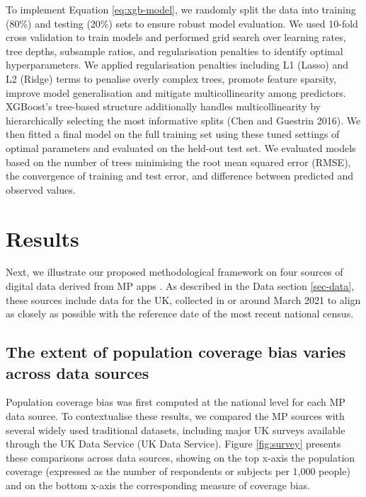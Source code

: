 \documentclass{article}
\begin{document}
To implement Equation \ref{eq:xgb-model}, we randomly split the data
into training (80\%) and testing (20\%) sets to ensure robust model
evaluation. We used 10-fold cross validation to train models and
performed grid search over learning rates, tree depths, subsample
ratios, and regularisation penalties to identify optimal
hyperparameters. We applied regularisation penalties including L1
(Lasso) and L2 (Ridge) terms to penalise overly complex trees, promote
feature sparsity, improve model generalisation and mitigate
multicollinearity among predictors. XGBoost's tree-based structure
additionally handles multicollinearity by hierarchically selecting the
most informative splits (Chen and Guestrin 2016). We then fitted a final model on the
full training set using these tuned settings of optimal parameters and
evaluated on the held-out test set. We evaluated models based on the
number of trees minimising the root mean squared error (RMSE), the
convergence of training and test error, and difference between predicted
and observed values.

\section{Results}\label{results}

Next, we illustrate our proposed methodological framework on four
sources of digital data derived from MP apps . As
described in the Data section \ref{sec-data}, these sources include
data for the UK, collected in or around March 2021 to align as closely
as possible with the reference date of the most recent national census.

\subsection{The extent of population coverage bias varies across data sources}\label{the-extent-of-population-coverage-bias-varies-across-data-sources}

Population coverage bias was first computed at the national level for
each MP data source. To contextualise these results, we compared the MP
sources with several widely used traditional datasets, including major
UK surveys available through the UK Data Service
(UK Data Service). Figure \ref{fig:survey} presents these
comparisons across data sources, showing on the top x-axis the
population coverage (expressed as the number of respondents or subjects
per 1,000 people) and on the bottom x-axis the corresponding measure of
coverage bias.
\end{document}
